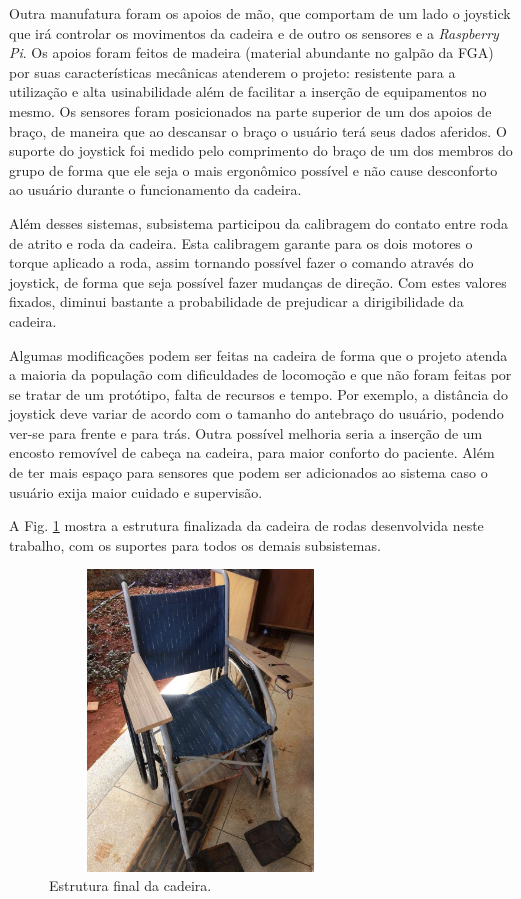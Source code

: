 Outra manufatura foram os apoios de mão, que comportam de um lado o joystick que irá controlar os movimentos da cadeira e de outro os sensores e a \textit{Raspberry Pi}. Os apoios foram feitos de madeira (material abundante no galpão da FGA) por suas características mecânicas atenderem o projeto: resistente para a utilização e alta usinabilidade além de facilitar a inserção de equipamentos no mesmo. Os sensores foram posicionados na parte superior de um dos apoios de braço, de maneira que ao descansar o braço o usuário terá seus dados aferidos. O suporte do joystick foi medido pelo comprimento do braço de um dos membros do grupo de forma que ele seja o mais ergonômico possível e não cause desconforto ao usuário durante o funcionamento da cadeira.

Além desses sistemas,  subsistema participou  da calibragem do contato entre roda de atrito e roda da cadeira. Esta calibragem garante para os dois motores o torque aplicado a roda, assim tornando possível fazer o comando através do joystick, de forma que seja possível fazer mudanças de direção. Com estes valores fixados, diminui bastante a probabilidade de prejudicar a dirigibilidade da cadeira.

Algumas modificações podem ser feitas na cadeira de forma que o projeto atenda a maioria da população com dificuldades de locomoção e que não foram feitas por se tratar de um protótipo, falta de recursos e tempo. Por exemplo, a distância do joystick deve variar de acordo com o tamanho do antebraço do usuário, podendo ver-se para frente e para trás. Outra possível melhoria seria a inserção de um encosto removível de cabeça na cadeira, para maior conforto do paciente. Além de ter mais espaço para sensores que podem ser adicionados ao sistema caso o usuário exija maior cuidado e supervisão.

A Fig. \ref{fig:cadeira_final} mostra a estrutura finalizada da cadeira de rodas desenvolvida neste trabalho, com os suportes para todos os demais subsistemas.

\begin{figure}
    \begin{center}
        \includegraphics[width=8cm,height=8cm,keepaspectratio]{figuras/cadeira_final.jpg}
    \end{center}
    \caption{Estrutura final da cadeira.}
    \label{fig:cadeira_final}
\end{figure}
